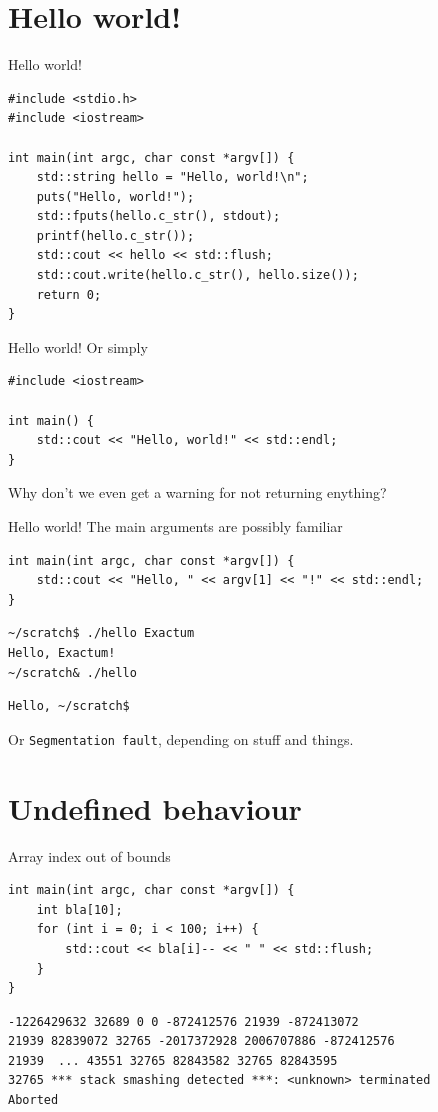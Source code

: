 \documentclass[11pt, aspectratio=169, table]{beamer}
\begin{document}
\section{Hello world!}
\begin{frame}[fragile]{Hello world!}
\begin{verbatim}
#include <stdio.h>
#include <iostream>

int main(int argc, char const *argv[]) {
    std::string hello = "Hello, world!\n";
    puts("Hello, world!");
    std::fputs(hello.c_str(), stdout);
    printf(hello.c_str());
    std::cout << hello << std::flush;
    std::cout.write(hello.c_str(), hello.size());
    return 0;
}
\end{verbatim}
\end{frame}

\begin{frame}[fragile]{Hello world!}
Or simply

\begin{verbatim}
#include <iostream>

int main() {
    std::cout << "Hello, world!" << std::endl;
}
\end{verbatim}

Why don't we even get a warning for not returning enything?
\end{frame}

\begin{frame}[fragile]{Hello world!}
The main arguments are possibly familiar

\begin{verbatim}
int main(int argc, char const *argv[]) {
	std::cout << "Hello, " << argv[1] << "!" << std::endl;
}
\end{verbatim}

\begin{verbatim}
~/scratch$ ./hello Exactum
Hello, Exactum!
~/scratch& ./hello
\end{verbatim}
\pause\vspace{-1.2cm}
\begin{verbatim}
Hello, ~/scratch$
\end{verbatim}

Or \texttt{Segmentation fault}, depending on stuff and things.
\end{frame}

\section{Undefined behaviour}
\begin{frame}[fragile]{Array index out of bounds}
\begin{verbatim}
int main(int argc, char const *argv[]) {
    int bla[10];
    for (int i = 0; i < 100; i++) {
        std::cout << bla[i]-- << " " << std::flush;
    }
}
\end{verbatim}

\pause\begin{verbatim}
-1226429632 32689 0 0 -872412576 21939 -872413072 
21939 82839072 32765 -2017372928 2006707886 -872412576 
21939  ... 43551 32765 82843582 32765 82843595 
32765 *** stack smashing detected ***: <unknown> terminated
Aborted
\end{verbatim}
\end{frame}
\end{document}

